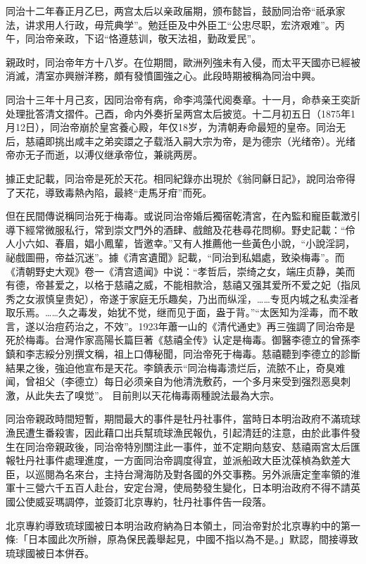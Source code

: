 同治十二年春正月乙巳，两宫太后以亲政届期，颁布懿旨，鼓励同治帝“祇承家法，讲求用人行政，毋荒典学”。勉廷臣及中外臣工“公忠尽职，宏济艰难”。丙午，同治帝亲政，下诏“恪遵慈训，敬天法祖，勤政爱民”。

親政时，同治帝年方十八岁。在位期間，歐洲列強未有入侵，而太平天國亦已經被消滅，清室亦興辦洋務，頗有發憤圖強之心。此段時期被稱為同治中興。

同治十三年十月己亥，因同治帝有病，命李鸿藻代阅奏章。十一月，命恭亲王奕訢处理批答清文摺件。己酉，命内外奏折呈两宫太后披览。十二月初五日（1875年1月12日），同治帝崩於皇宮養心殿，年仅18岁，为清朝寿命最短的皇帝。同治无后，慈禧即挑出咸丰之弟奕譞之子载湉入嗣大宗为帝，是为德宗（光绪帝）。光绪帝亦无子而逝，以溥仪继承帝位，兼祧两房。

據正史記載，同治帝是死於天花。相同紀錄亦出現於《翁同龢日記》，說同治帝得了天花，導致毒熱內陷，最終“走馬牙疳”而死。

但在民間傳说稱同治死于梅毒。或说同治帝婚后獨宿乾清宮，在內監和寵臣載澂引導下經常微服私行，常到崇文門外的酒肆、戲館及花巷尋花問柳。野史記載：“伶人小六如、春眉，娼小鳳輩，皆邀幸。”又有人推薦他一些黃色小說，“小說淫詞，祕戲圖冊，帝益沉迷”。據《清宮遺聞》記載，“同治到私娼處，致染梅毒”。而《清朝野史大观》卷一《清宫遗闻》中说：“孝哲后，崇绮之女，端庄贞静，美而有德，帝甚爱之，以格于慈禧之威，不能相款洽，慈禧又强其爱所不爱之妃（指凤秀之女淑慎皇贵妃），帝遂于家庭无乐趣矣，乃出而纵淫，……专觅内城之私卖淫者取乐焉。……久之毒发，始犹不觉，继而见于面，盎于背。”“太医知为淫毒，而不敢言，遂以治痘药治之，不效”。1923年蕭一山的《清代通史》再三強調了同治帝是死於梅毒。台灣作家高陽长篇巨著《慈禧全传》认定是梅毒。御醫李德立的曾孫李鎮和李志綏分別撰文稱，祖上口傳秘聞，同治帝死于梅毒。慈禧聽到李德立的診斷結果之後，強迫他宣布是天花。李鎮表示“同治梅毒溃烂后，流脓不止，奇臭难闻，曾祖父（李德立）每日必须亲自为他清洗敷药，一个多月来受到强烈恶臭刺激，从此失去了嗅觉”。 目前則以天花梅毒兩種說法最為大宗。

同治帝親政時間短暫，期間最大的事件是牡丹社事件，當時日本明治政府不滿琉球漁民遭生番殺害，因此藉口出兵幫琉球漁民報仇，引起清廷的注意，由於此事件發生在同治帝親政後，同治帝特別關注此一事件，並不定期向慈安、慈禧兩宮太后匯報牡丹社事件處理進度，一方面同治帝調度得宜，並派船政大臣沈葆楨為欽差大臣，以巡閱為名來台，主持台灣海防及對各國的外交事務。另外派唐定奎率領的淮軍十三營六千五百人赴台，安定台灣，使局勢發生變化，日本明治政府不得不請英國公使威妥瑪調停，並簽訂北京專約，牡丹社事件告一段落。

北京專約導致琉球國被日本明治政府納為日本領土，同治帝對於北京專約中的第一條:「日本國此次所辦，原為保民義舉起見，中國不指以為不是。」默認，間接導致琉球國被日本併吞。

